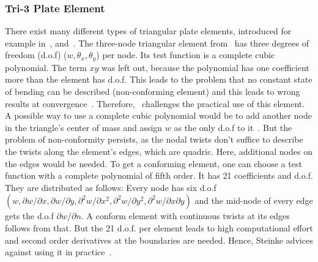   \subsubsection{Tri-3 Plate Element}\label{sec:Shell-Plate-Tri}
  There exist many different types of triangular plate elements, introduced for example in~\cite{batoz1980study}, \cite{tocher1963analysis} and~\cite{specht1988modified}. The three-node triangular element from~\cite{tocher1963analysis} has three degrees of freedom (d.o.f) ($w, \theta_x, \theta_y$) per node. Its test function is a complete cubic polynomial. The term $xy$ was left out, because the polynomial has one coefficient more than the element has d.o.f. This leads to the problem that no constant state of bending can be described (non-conforming element) and this leads to wrong results at convergence~\cite{steinke2005finite}. Therefore,~\cite{steinke2005finite} challenges the practical use of this element. A possible way to use a complete cubic polynomial would be to add another node in the triangle's center of mass and assign $w$ as the only d.o.f to it~\cite{steinke2005finite}. But the problem of non-conformity persists, as the nodal twists don't suffice to describe the twists along the element's edges, which are quadric. Here, additional nodes on the edges would be needed. To get a conforming element, one can choose a test function with a complete polynomial of fifth order. It has 21 coefficients and d.o.f. They are distributed as follows: Every node has six d.o.f $(w, \partial w/\partial x, \partial w/\partial y, \partial^2 w/\partial x^2, \partial^2 w/\partial y^2, \partial^2 w/\partial x\partial y)$ and the mid-node of every edge gets the d.o.f $\partial w/\partial n$. A conform element with continuous twists at its edges follows from that. But the 21 d.o.f. per element leads to high computational effort and second order derivatives at the boundaries are needed. Hence, Steinke advices against using it in practice~\cite{steinke2005finite}.
  

